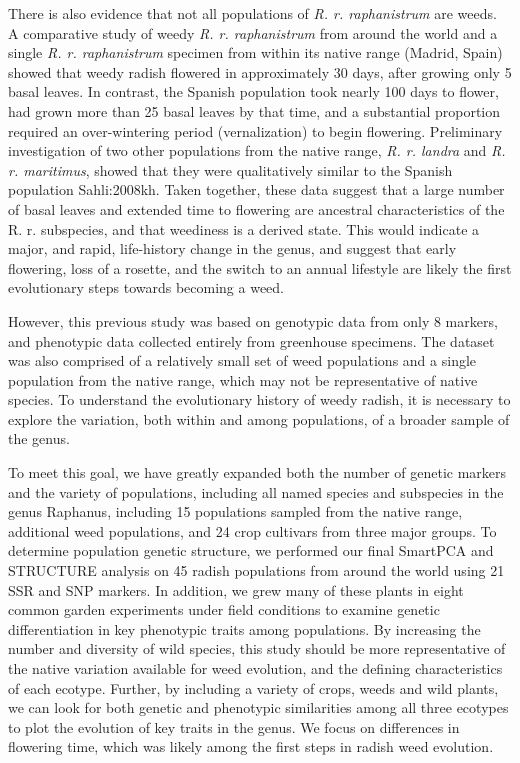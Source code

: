 \documentclass[twocolumn]{bmcart}%
\begin{document}
There is also evidence that not all populations of \textit{R. r. raphanistrum} are weeds. A comparative study of weedy \textit{R. r. raphanistrum} from around the world and a single \textit{R. r. raphanistrum} specimen from within its native range (Madrid, Spain) showed that weedy radish flowered in approximately 30 days, after growing only 5 basal leaves. In contrast, the Spanish population took nearly 100 days to flower, had grown more than 25 basal leaves by that time, and a substantial proportion required an over-wintering period (vernalization) to begin flowering. Preliminary investigation of two other populations from the native range, \textit{R. r. landra} and \textit{R. r. maritimus}, showed that they were qualitatively similar to the Spanish population {Sahli:2008kh}. Taken together, these data suggest that a large number of basal leaves and extended time to flowering are ancestral characteristics of the R. r. subspecies, and that weediness is a derived state. This would indicate a major, and rapid, life-history change in the genus, and suggest that early flowering, loss of a rosette, and the switch to an annual lifestyle are likely the first evolutionary steps towards becoming a weed.

However, this previous study was based on genotypic data from only 8 markers, and phenotypic data collected entirely from greenhouse specimens. The dataset was also comprised of a relatively small set of weed populations and a single population from the native range, which may not be representative of native species. To understand the evolutionary history of weedy radish, it is necessary to explore the variation, both within and among populations, of a broader sample of the genus.
%
%
%

To meet this goal, we have greatly expanded both the number of genetic markers and the variety of populations, including all named species and subspecies in the genus Raphanus, including 15 populations sampled from the native range, additional weed populations, and 24 crop cultivars from three major groups. To determine population genetic structure, we performed our final SmartPCA and STRUCTURE analysis on 45 radish populations from around the world using 21 SSR and SNP markers. In addition, we grew many of these plants in eight common garden experiments under field conditions to examine genetic differentiation in key phenotypic traits among populations. By increasing the number and diversity of wild species, this study should be more representative of the native variation available for weed evolution, and the defining characteristics of each ecotype. Further, by including a variety of crops, weeds and wild plants, we can look for both genetic and phenotypic similarities among all three ecotypes to plot the evolution of key traits in the genus. We focus on differences in flowering time, which was likely among the first steps in radish weed evolution. 
%
%
%
\end{document}
